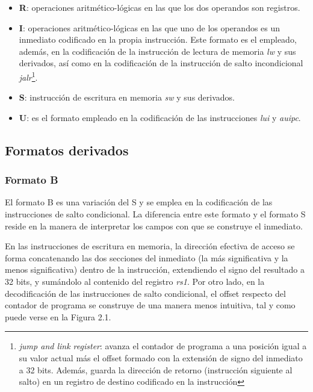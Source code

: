 \begin{itemize}
  \item \textbf{R}: operaciones aritmético-lógicas en las que los dos operandos son registros.
  \vspace{-0.2cm}
  \item \textbf{I}: operaciones aritmético-lógicas en las que uno de los operandos es un inmediato codificado en la propia instrucción. Este formato es el empleado, además, en la codificación de la instrucción de lectura de memoria \textit{lw} y sus derivados, así como en la codificación de la instrucción de salto incondicional \textit{jalr}\footnote{\textit{jump and link register}: avanza el contador de programa a una posición igual a su valor actual más el offset formado con la extensión de signo del inmediato a 32 bits. Además, guarda la dirección de retorno (instrucción siguiente al salto) en un registro de destino codificado en la instrucción}.
  \vspace{-0.2cm}
  \item \textbf{S}: instrucción de escritura en memoria \textit{sw} y sus derivados.
  \vspace{-0.2cm}
  \item \textbf{U}: es el formato empleado en la codificación de las instrucciones \textit{lui} y \textit{auipc}.
\end{itemize}

\subsection{Formatos derivados}

\subsubsection{Formato B}

El formato B es una variación del S y se emplea en la codificación de las instrucciones de salto condicional. La diferencia entre este formato y el formato S reside en la manera de interpretar los campos con que se construye el inmediato.

En las instrucciones de escritura en memoria, la dirección efectiva de acceso se forma concatenando las dos secciones del inmediato (la más significativa y la menos significativa) dentro de la instrucción, extendiendo el signo del resultado a 32 bits, y sumándolo al contenido del registro \textit{rs1}. Por otro lado, en la decodificación de las instrucciones de salto condicional, el offset respecto del contador de programa se construye de una manera menos intuitiva, tal y como puede verse en la Figura 2.1.

